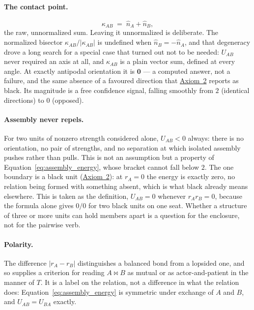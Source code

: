 \documentclass[12pt, a4paper]{article}
\begin{document}
\paragraph{The contact point.}
\begin{equation}
    \kappa_{AB} \;=\; \hat n_A + \hat n_B,
    \label{eq:assembly_contact}
\end{equation}
the raw, unnormalized sum. Leaving it unnormalized is deliberate.
The normalized bisector $\kappa_{AB}/\lvert\kappa_{AB}\rvert$ is
undefined when $\hat n_B = -\hat n_A$, and that degeneracy drove a
long search for a special case that turned out not to be needed:
$U_{AB}$ never required an axis at all, and $\kappa_{AB}$ is a plain
vector sum, defined at every angle. At exactly antipodal orientation
it is $\mathbf{0}$ --- a computed answer, not a failure, and the same
absence of a favoured direction that \hyperref[subsec:axiom_null]{Axiom~2}
reports as black. Its magnitude is a free confidence signal, falling
smoothly from $2$ (identical directions) to $0$ (opposed).

\paragraph{Assembly never repels.}
For two units of nonzero strength considered alone, $U_{AB}<0$
always: there is no orientation, no pair of strengths, and no
separation at which isolated assembly pushes rather than pulls. This
is not an assumption but a property of
Equation~\eqref{eq:assembly_energy}, whose bracket cannot fall below
$2$. The one boundary is a black unit
(\hyperref[subsec:axiom_null]{Axiom~2}): at $r_A=0$ the energy is exactly
zero, no relation being formed with something absent, which is what
black already means elsewhere. This is taken as the definition,
$U_{AB}=0$ whenever $r_Ar_B=0$, because the formula alone gives $0/0$
for two black units on one seat. Whether a structure of three or more
units can hold members apart is a question for the enclosure, not
for the pairwise verb.

\paragraph{Polarity.}
The difference $\lvert r_A - r_B\rvert$ distinguishes a balanced bond
from a lopsided one, and so supplies a criterion for reading
$A\bowtie B$ as mutual or as actor-and-patient in the manner of $T$.
It is a label on the relation, not a difference in what the relation
does: Equation~\eqref{eq:assembly_energy} is symmetric under exchange
of $A$ and $B$, and $U_{AB}=U_{BA}$ exactly.
\end{document}
